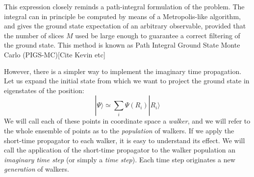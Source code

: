 This expression closely reminds a path-integral formulation of the problem. The integral can in principle be computed by means of a  Metropolis-like algorithm, and gives the ground state
expectation of an arbitrary observable, provided that the number of slices $M$ used be large enough to guarantee a correct filtering of the ground state. This method is known as Path Integral Ground State Monte Carlo (PIGS-MC)[Cite Kevin etc]

However, there is a simpler way to implement the imaginary time propagation. Let us expand the initial state from which we want to project the ground state in eigenstates of the position:
\begin{equation}
|\Psi\rangle \simeq \sum_i\Psi(R_i)|R_i\rangle
\end{equation} 
We will call each of these points in coordinate space a {\it walker}, and we will refer to the whole ensemble of points as to the {\it population} of walkers. If we apply the short-time propagator to each walker, it is easy to understand its effect. We will call the application of the short-time propagator to the walker population an {\it imaginary time step} (or simply a {\it time step}). Each time step originates a new {\it generation} of walkers.

